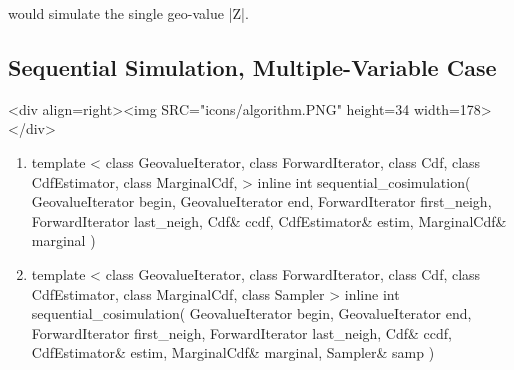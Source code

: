 \documentclass[12pt,twoside]{report}
\begin{document}
\noindent would simulate the single geo-value |Z|.  
%
% 
% 
% 
% 
% 
% 
%  
% 
% 
% 
% 
%







\subsection{Sequential Simulation, Multiple-Variable Case}
\begin{htmlonly}
<div align=right><img SRC="icons/algorithm.PNG" height=34 width=178></div>
\end{htmlonly}


\begin{enumerate}
\item 
\begin{code}
template
<
  class GeovalueIterator,
  class ForwardIterator,
  class Cdf,
  class CdfEstimator,
  class MarginalCdf,
>
inline int
sequential_cosimulation(
  GeovalueIterator begin, GeovalueIterator end,
  ForwardIterator first_neigh, ForwardIterator last_neigh, 
  Cdf& ccdf,
  CdfEstimator& estim,
  MarginalCdf& marginal
)
 
\end{code}

\item 
\begin{code}
template
<
  class GeovalueIterator,
  class ForwardIterator,
  class Cdf,
  class CdfEstimator,
  class MarginalCdf,
  class Sampler
>
inline int
sequential_cosimulation(
  GeovalueIterator begin, GeovalueIterator end,
  ForwardIterator first_neigh, ForwardIterator last_neigh, 
  Cdf& ccdf,
  CdfEstimator& estim,
  MarginalCdf& marginal,
  Sampler& samp
) 

\end{code}

\end{enumerate}
\end{document}
